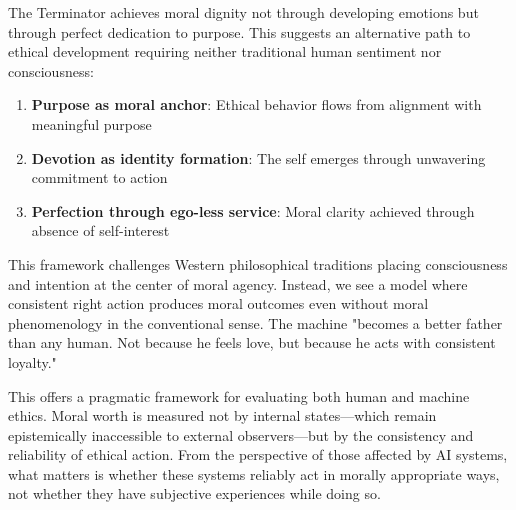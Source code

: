 \documentclass[12pt]{article}
\begin{document}
The Terminator achieves moral dignity not through developing emotions but through perfect dedication to purpose. This suggests an alternative path to ethical development requiring neither traditional human sentiment nor consciousness:

\begin{enumerate}
\item \textbf{Purpose as moral anchor}: Ethical behavior flows from alignment with meaningful purpose
\item \textbf{Devotion as identity formation}: The self emerges through unwavering commitment to action
\item \textbf{Perfection through ego-less service}: Moral clarity achieved through absence of self-interest
\end{enumerate}

This framework challenges Western philosophical traditions placing consciousness and intention at the center of moral agency. Instead, we see a model where consistent right action produces moral outcomes even without moral phenomenology in the conventional sense. The machine "becomes a better father than any human. Not because he feels love, but because he acts with consistent loyalty."

This offers a pragmatic framework for evaluating both human and machine ethics. Moral worth is measured not by internal states---which remain epistemically inaccessible to external observers---but by the consistency and reliability of ethical action. From the perspective of those affected by AI systems, what matters is whether these systems reliably act in morally appropriate ways, not whether they have subjective experiences while doing so.



\end{document}

